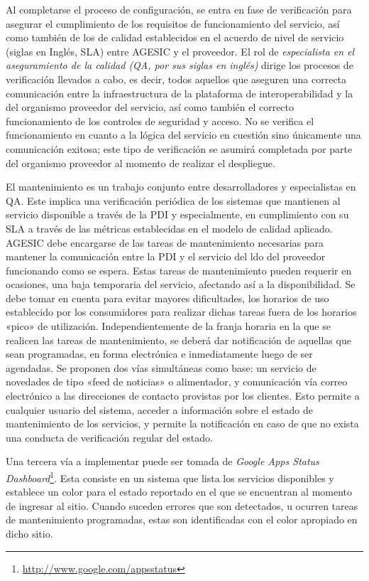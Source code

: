       Al completarse el proceso de configuración, se entra en fase de verificación para asegurar el cumplimiento de los requisitos de funcionamiento del servicio, así como también de los de calidad establecidos en el acuerdo de nivel de servicio (siglas en Inglés, SLA) entre AGESIC y el proveedor. El rol de \emph{especialista en el aseguramiento de la calidad (QA, por sus siglas en inglés)} dirige los procesos de verificación llevados a cabo, es decir, todos aquellos que aseguren una correcta comunicación entre la infraestructura de la plataforma de interoperabilidad y la del organismo proveedor del servicio, así como también el correcto funcionamiento de los controles de seguridad y acceso. No se verifica el funcionamiento en cuanto a la lógica del servicio en cuestión sino únicamente una comunicación exitosa; este tipo de verificación se asumirá completada por parte del organismo proveedor al momento de realizar el despliegue.

      El mantenimiento es un trabajo conjunto entre desarrolladores y especialistas en QA. Este implica una verificación periódica de los sistemas que mantienen al servicio disponible a través de la PDI y especialmente, en cumplimiento con su SLA a través de las métricas establecidas en el modelo de calidad aplicado. AGESIC debe encargarse de las tareas de mantenimiento necesarias para mantener la comunicación entre la PDI y el servicio del ldo del proveedor funcionando como se espera. Estas tareas de mantenimiento pueden requerir en ocasiones, una baja temporaria del servicio, afectando así a la disponibilidad. Se debe tomar en cuenta para evitar mayores dificultades, los horarios de uso establecido por los consumidores para realizar dichas tareas fuera de los horarios «pico» de utilización. Independientemente de la franja horaria en la que se realicen las tareas de mantenimiento, se deberá dar notificación de aquellas que sean programadas, en forma electrónica e inmediatamente luego de ser agendadas. Se proponen dos vías simultáneas como base: un servicio de novedades de tipo «feed de noticias» o alimentador, y comunicación vía correo electrónico a las direcciones de contacto provistas por los clientes. Esto permite a cualquier usuario del sistema, acceder a información sobre el estado de mantenimiento de los servicios, y permite la notificación en caso de que no exista una conducta de verificación regular del estado.

      Una tercera vía a implementar puede ser tomada de \emph{Google Apps Status Dashboard}\footnote{\url{http://www.google.com/appsstatus}}. Esta consiste en un sistema que lista los servicios disponibles y establece un color para el estado reportado en el que se encuentran al momento de ingresar al sitio. Cuando suceden errores que son detectados, u ocurren tareas de mantenimiento programadas, estas son identificadas con el color apropiado en dicho sitio.

